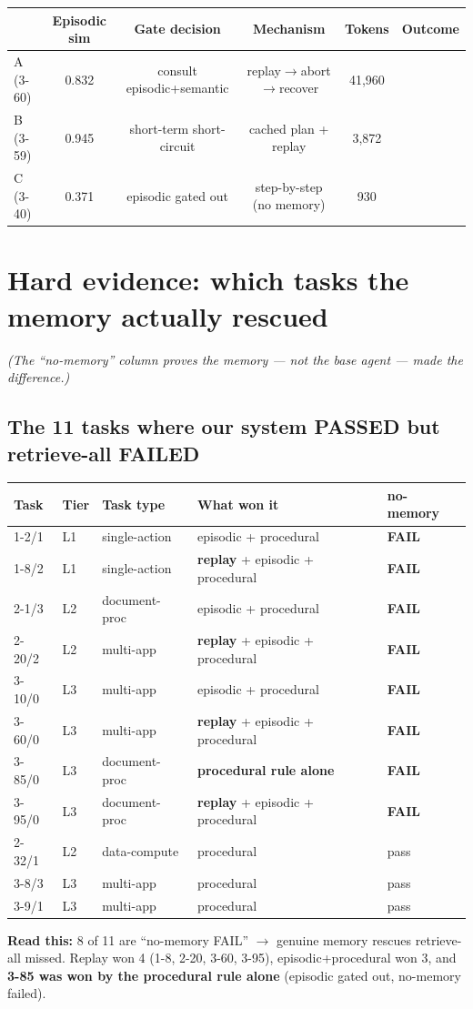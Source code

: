 \documentclass[11pt]{article}
\newcommand{\cmark}{\textcolor{green!55!black}{\ding{51}}}
\newcommand{\xmark}{\textcolor{red!75!black}{\ding{55}}}
\begin{document}
\begin{center}
\begin{tabular}{@{}lcccc@{}}
\toprule
 & Episodic sim & Gate decision & Mechanism & Tokens & Outcome \\
\midrule
A (3-60) & 0.832 & consult episodic+semantic & replay$\to$abort$\to$recover & 41{,}960 & \cmark \\
B (3-59) & 0.945 & short-term short-circuit & cached plan + replay & 3{,}872 & \cmark \\
C (3-40) & 0.371 & episodic gated out & step-by-step (no memory) & 930 & \xmark \\
\bottomrule
\end{tabular}
\end{center}

\section{Hard evidence: which tasks the memory actually rescued}
\emph{(The ``no-memory'' column proves the memory --- not the base agent --- made the difference.)}

\subsection{The 11 tasks where our system PASSED but retrieve-all FAILED}
\begin{center}
\begin{tabular}{@{}llllp{4.6cm}@{}}
\toprule
Task & Tier & Task type & What won it & no-memory \\
\midrule
1-2/1  & L1 & single-action  & episodic + procedural & \textbf{FAIL} \\
1-8/2  & L1 & single-action  & \textbf{replay} + episodic + procedural & \textbf{FAIL} \\
2-1/3  & L2 & document-proc  & episodic + procedural & \textbf{FAIL} \\
2-20/2 & L2 & multi-app      & \textbf{replay} + episodic + procedural & \textbf{FAIL} \\
3-10/0 & L3 & multi-app      & episodic + procedural & \textbf{FAIL} \\
3-60/0 & L3 & multi-app      & \textbf{replay} + episodic + procedural & \textbf{FAIL} \\
3-85/0 & L3 & document-proc  & \textbf{procedural rule alone} & \textbf{FAIL} \\
3-95/0 & L3 & document-proc  & \textbf{replay} + episodic + procedural & \textbf{FAIL} \\
2-32/1 & L2 & data-compute   & procedural & pass \\
3-8/3  & L3 & multi-app      & procedural & pass \\
3-9/1  & L3 & multi-app      & procedural & pass \\
\bottomrule
\end{tabular}
\end{center}
\textbf{Read this:} 8 of 11 are ``no-memory FAIL'' $\to$ genuine memory rescues retrieve-all missed.
Replay won 4 (1-8, 2-20, 3-60, 3-95), episodic+procedural won 3, and \textbf{3-85 was won by the
procedural rule alone} (episodic gated out, no-memory failed).
\end{document}
